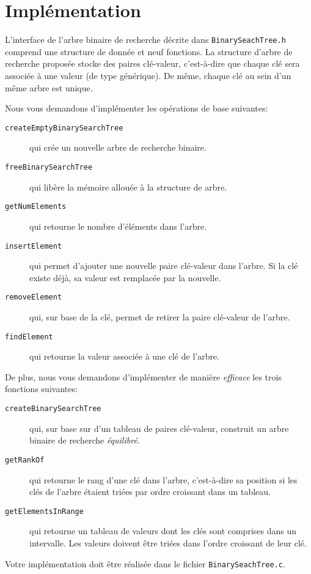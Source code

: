 \documentclass[a4paper,10pt]{article}
\begin{document}
\section{Implémentation}
L'interface de l'arbre binaire de recherche décrite dans \texttt{BinarySeachTree.h} comprend une structure de donnée et neuf fonctions. La structure d'arbre de recherche proposée stocke des paires clé-valeur, c'est-à-dire que chaque clé sera associée à une valeur (de type générique). De même, chaque clé au sein d'un même arbre est unique.

Nous vous demandons d'implémenter les opérations de base suivantes:
\begin{description}
\item[\texttt{createEmptyBinarySearchTree}] qui crée un nouvelle arbre de recherche binaire.
\item[\texttt{freeBinarySearchTree}]  qui libère la mémoire allouée à la structure de arbre.
\item[\texttt{getNumElements}] qui retourne le nombre d'éléments dans l'arbre.
\item[\texttt{insertElement}] qui permet d'ajouter une nouvelle paire clé-valeur dans l'arbre. Si la clé existe déjà, sa valeur est remplacée par la nouvelle.
\item[\texttt{removeElement}] qui, sur base de la clé, permet de retirer la paire clé-valeur de l'arbre.
\item[\texttt{findElement}] qui retourne la valeur associée à une clé de l'arbre.
\end{description}

De plus, nous vous demandons d'implémenter de manière {\em efficace} les trois fonctions suivantes:
\begin{description}
\item[\texttt{createBinarySearchTree}] qui, sur base sur d'un tableau de paires clé-valeur, construit un arbre binaire de recherche {\em équilibré}.
\item[\texttt{getRankOf}] qui retourne le rang d'une clé dans l'arbre, c'est-à-dire sa position si les clés de l'arbre étaient triées par ordre croissant dans un tableau.
\item[\texttt{getElementsInRange}] qui retourne un tableau de valeurs dont les clés sont comprises dans un intervalle. Les valeurs doivent être triées dans l'ordre croissant de leur clé.
\end{description}
Votre implémentation doit être réalisée dans le fichier \texttt{BinarySeachTree.c}.
\end{document}
